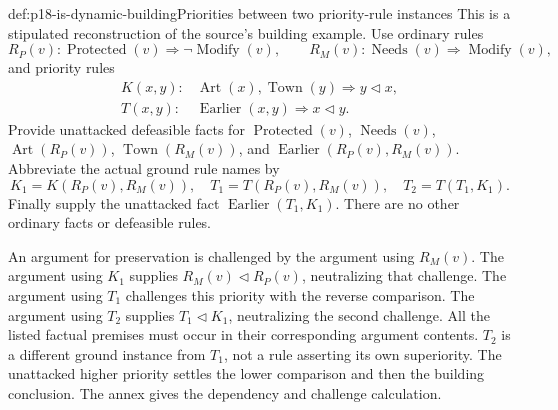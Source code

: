 \begin{hbexample}{def:p18-is-dynamic-building}{Priorities between two priority-rule instances}
This is a stipulated reconstruction of the source's building example.
Use ordinary rules
\[
R_P(v):\operatorname{Protected}(v)\Rightarrow\neg\operatorname{Modify}(v),
\qquad
R_M(v):\operatorname{Needs}(v)\Rightarrow\operatorname{Modify}(v),
\]
and priority rules
\[
\begin{split}
K(x,y):&\operatorname{Art}(x),\operatorname{Town}(y)
                                  \Rightarrow y\triangleleft x,\\
T(x,y):&\operatorname{Earlier}(x,y)\Rightarrow x\triangleleft y.
\end{split}
\]
Provide unattacked defeasible facts for \(\operatorname{Protected}(v)\),
\(\operatorname{Needs}(v)\), \(\operatorname{Art}(R_P(v))\),
\(\operatorname{Town}(R_M(v))\), and
\(\operatorname{Earlier}(R_P(v),R_M(v))\).
Abbreviate the actual ground rule names by
\[
 K_1=K(R_P(v),R_M(v)),\quad
 T_1=T(R_P(v),R_M(v)),\quad T_2=T(T_1,K_1).
\]
Finally supply the unattacked fact
\(\operatorname{Earlier}(T_1,K_1)\).
There are no other ordinary facts or defeasible rules.

An argument for preservation is challenged by the argument using
\(R_M(v)\). The argument using \(K_1\) supplies
\(R_M(v)\triangleleft R_P(v)\), neutralizing that challenge.
The argument using \(T_1\) challenges this priority with the reverse
comparison. The argument using \(T_2\) supplies
\(T_1\triangleleft K_1\), neutralizing the second challenge.
All the listed factual premises must occur in their corresponding
argument contents. \(T_2\) is a different ground instance from
\(T_1\), not a rule asserting its own superiority.
The unattacked higher priority settles the lower comparison and
then the building conclusion. The annex gives the dependency and
challenge calculation.
\end{hbexample}

